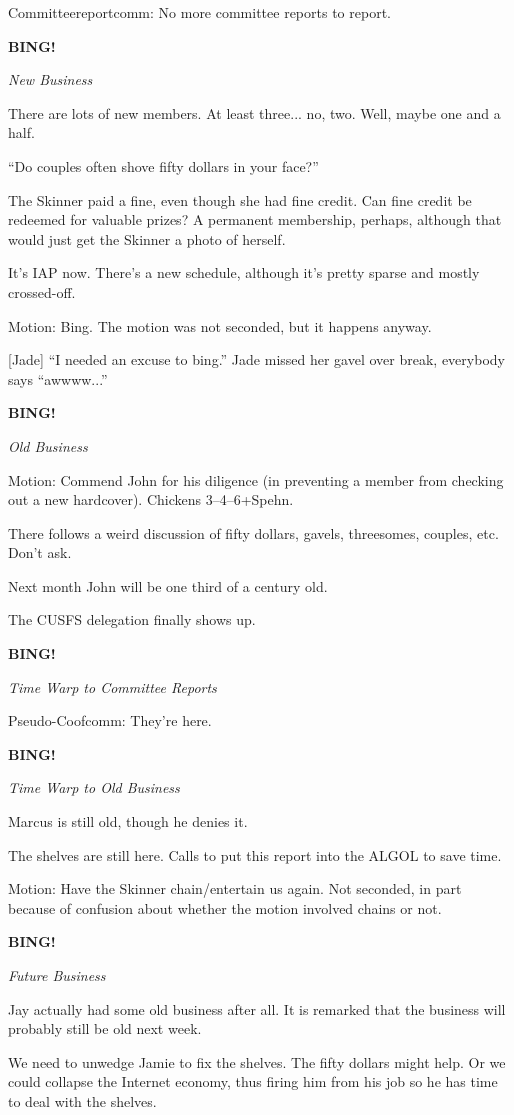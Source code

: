 \documentclass[12pt]{article}
\newcommand{\bing}{{\bf BING!} }
\newcommand{\goto}[1]{\bing \vskip 12pt \centerline{{\em{#1}}}}
\begin{document}
Committeereportcomm: No more committee reports to report.

\goto{New Business}

There are lots of new members.  At least three... no, two.  Well,
maybe one and a half.

``Do couples often shove fifty dollars in your face?''

The Skinner paid a fine, even though she had fine credit.  Can fine
credit be redeemed for valuable prizes?  A permanent membership,
perhaps, although that would just get the Skinner a photo of herself.

It's IAP now.  There's a new schedule, although it's pretty sparse
and mostly crossed-off.

Motion: Bing.  The motion was not seconded, but it happens anyway.

[Jade] ``I needed an excuse to bing.''  Jade missed her gavel over
break, everybody says ``awwww...''

\goto{Old Business}

Motion: Commend John for his diligence (in preventing a member from
checking out a new hardcover).  Chickens 3--4--6+Spehn.

There follows a weird discussion of fifty dollars, gavels, threesomes,
couples, etc.  Don't ask.

Next month John will be one third of a century old.

The CUSFS delegation finally shows up.

\goto{Time Warp to Committee Reports}

Pseudo-Coofcomm: They're here.

\goto{Time Warp to Old Business}

Marcus is still old, though he denies it.

The shelves are still here.  Calls to put this report into the
ALGOL to save time.

Motion: Have the Skinner chain/entertain us again.  Not seconded,
in part because of confusion about whether the motion involved chains
or not.

\goto{Future Business}

Jay actually had some old business after all.  It is remarked that the
business will probably still be old next week.

We need to unwedge Jamie to fix the shelves.  The fifty dollars might
help.  Or we could collapse the Internet economy, thus firing him from
his job so he has time to deal with the shelves.
\end{document}
